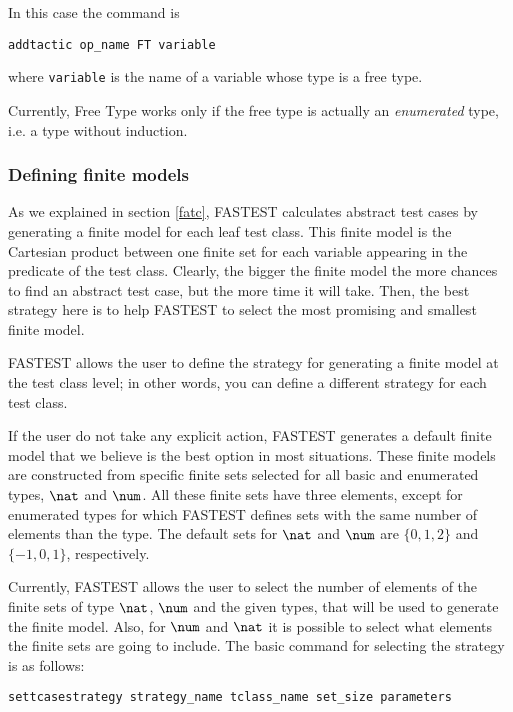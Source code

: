 \begin{itemize}
In this case the command is

\begin{center}
\verb+addtactic op_name FT variable+
\end{center}

where \verb+variable+ is the name of a variable whose type is a free type.

Currently, Free Type works only if the free type is actually an {\it enumerated} type, i.e. a type without induction.
\end{itemize}

\subsubsection{Defining finite models}

As we explained in section \ref{fatc}, FASTEST calculates abstract test cases by generating a finite model for each leaf test class. This finite model is the Cartesian product between one finite set for each variable appearing in the predicate of the test class. Clearly, the bigger the finite model the more chances to find an abstract test case, but the more time it will take. Then, the best strategy here is to help FASTEST to select the most promising and smallest finite model.

FASTEST allows the user to define the strategy for generating a finite model at the test class level; in other words, you can define a different strategy for each test class.

If the user do not take any explicit action, FASTEST generates a default finite model that we believe is the best option in most situations. These finite models are constructed from specific finite sets selected for all basic and enumerated types, $\nat$ and $\num$. All these finite sets have three elements, except for enumerated types for which FASTEST defines sets with the same number of elements than the type. The default sets for $\nat$ and $\num$ are $\{0,1,2\}$ and $\{-1,0,1\}$, respectively.

Currently, FASTEST allows the user to select the number of elements of the finite sets of type $\nat$, $\num$ and the given types, that will be used to generate the finite model. Also, for $\num$ and $\nat$ it is possible to select what elements the finite sets are going to include. The basic command for selecting the strategy is as follows:

\begin{center}
\verb+settcasestrategy strategy_name tclass_name set_size parameters+
\end{center}

